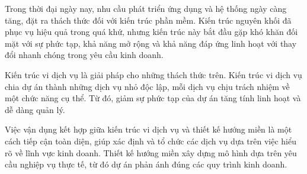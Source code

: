 Trong thời đại ngày nay, nhu cầu phát triển ứng dụng và hệ thống ngày càng tăng, đặt ra thách thức đối với kiến trúc phần mềm. Kiến trúc nguyên khối đã phục vụ hiệu quả trong quá khứ, nhưng kiến trúc này bắt đầu gặp khó khăn đối mặt với sự phức tạp, khả năng mở rộng và khả năng đáp ứng linh hoạt với thay đổi nhanh chóng trong yêu cầu kinh doanh.

Kiến trúc vi dịch vụ là giải pháp cho những thách thức trên. Kiến trúc vi dịch vụ chia dự án thành những dịch vụ nhỏ độc lập, mỗi dịch vụ chịu trách nhiệm về một chức năng cụ thể. Từ đó, giảm sự phức tạp của dự án tăng tính linh hoạt và dễ dàng quản lý.

Việc vận dụng kết hợp giữa kiến trúc vi dịch vụ và thiết kế hướng miền là một cách tiếp cận toàn diện, giúp xác định và tổ chức các dịch vụ dựa trên việc hiểu rõ về lĩnh vực kinh doanh. Thiết kế hướng miền xây dựng mô hình dựa trên yêu cầu nghiệp vụ thực tế, từ đó dự án phản ánh đúng các quy trình kinh doanh.
